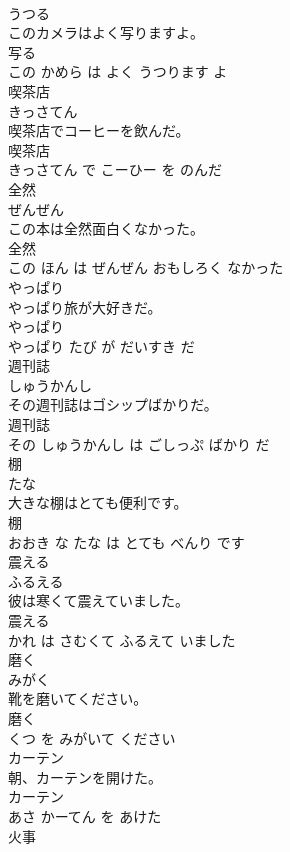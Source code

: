 \documentclass[8pt]{extreport}
\begin{document}
\begin{CJK}{UTF8}{min}
\\	うつる			
\\	このカメラはよく写りますよ。	
\\	写る 
\\	この かめら は よく うつります よ			
\\	喫茶店	
\\	きっさてん			
\\	喫茶店でコーヒーを飲んだ。	
\\	喫茶店 
\\	きっさてん で こーひー を のんだ			
\\	全然	
\\	ぜんぜん			
\\	この本は全然面白くなかった。	
\\	全然 
\\	この ほん は ぜんぜん おもしろく なかった			
\\	やっぱり	
\\	やっぱり旅が大好きだ。	
\\	やっぱり 
\\	やっぱり たび が だいすき だ			
\\	週刊誌	
\\	しゅうかんし			
\\	その週刊誌はゴシップばかりだ。	
\\	週刊誌 
\\	その しゅうかんし は ごしっぷ ばかり だ			
\\	棚	
\\	たな			
\\	大きな棚はとても便利です。	
\\	棚 
\\	おおき な たな は とても べんり です			
\\	震える	
\\	ふるえる			
\\	彼は寒くて震えていました。	
\\	震える 
\\	かれ は さむくて ふるえて いました			
\\	磨く	
\\	みがく			
\\	靴を磨いてください。	
\\	磨く 
\\	くつ を みがいて ください			
\\	カーテン	
\\	朝、カーテンを開けた。	
\\	カーテン 
\\	あさ かーてん を あけた			
\\	火事	

\end{CJK}
\end{document}
